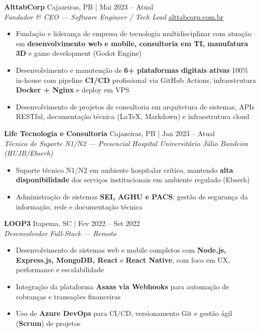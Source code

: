 \documentclass[a4paper]{article}
\begin{document}
\vspace{2mm}

\textbf{AlttabCorp} \hfill Cajazeiras, PB | Mai 2023 -- Atual\\
\textit{Fundador \& CEO — Software Engineer / Tech Lead} \hfill \href{https://alttabcorp.com.br}{alttabcorp.com.br}\\
\vspace{-3mm}
\begin{itemize}[leftmargin=*, itemsep=-3pt]
    \item Fundação e liderança de empresa de tecnologia multidisciplinar com atuação em \textbf{desenvolvimento web e mobile, consultoria em TI, manufatura 3D} e game development (Godot Engine)
    \item Desenvolvimento e manutenção de \textbf{6+ plataformas digitais ativas} 100\% in-house com pipeline \textbf{CI/CD} profissional via GitHub Actions, infraestrutura \textbf{Docker + Nginx} e deploy em VPS
    \item Desenvolvimento de projetos de consultoria em arquitetura de sistemas, APIs RESTful, documenta\c{c}\~{a}o t\'{e}cnica (LaTeX, Markdown) e infraestrutura cloud
\end{itemize}

\vspace{2mm}

\textbf{Life Tecnologia e Consultoria} \hfill Cajazeiras, PB | Jan 2023 -- Atual\\
\textit{Técnico de Suporte N1/N2 — Presencial} \hfill \textit{Hospital Universitário Júlio Bandeira (HUJB/Ebserh)}\\
\vspace{-3mm}
\begin{itemize}[leftmargin=*, itemsep=-3pt]
    \item Suporte técnico N1/N2 em ambiente hospitalar crítico, mantendo \textbf{alta disponibilidade} dos serviços institucionais em ambiente regulado (Ebserh)
    \item Administração de sistemas \textbf{SEI, AGHU e PACS}; gestão de segurança da informação, rede e documentação técnica
\end{itemize}

\vspace{2mm}

\textbf{LOOP3} \hfill Itapema, SC | Fev 2022 -- Set 2022\\
\textit{Desenvolvedor Full-Stack — Remoto}\\
\vspace{-3mm}
\begin{itemize}[leftmargin=*, itemsep=-3pt]
    \item Desenvolvimento de sistemas web e mobile completos com \textbf{Node.js, Express.js, MongoDB, React} e \textbf{React Native}, com foco em UX, performance e escalabilidade
    \item Integração da plataforma \textbf{Asaas via Webhooks} para automação de cobranças e transações financeiras
    \item Uso de \textbf{Azure DevOps} para CI/CD, versionamento Git e gestão ágil (\textbf{Scrum}) de projetos
\end{itemize}
\end{document}

